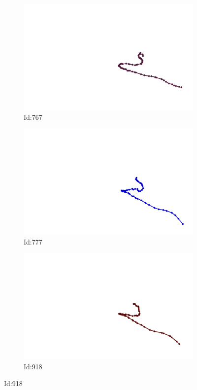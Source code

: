 \documentclass[12pt,twoside]{report}
\begin{document}
\begin{figure}
\centering
\begin{subfigure}[b]{0.20\textwidth}
\centering
\includegraphics[width=\textwidth]{../../trajectories/767.png}
\caption{Id:767}
\end{subfigure}
\begin{subfigure}[b]{0.20\textwidth}
\centering
\includegraphics[width=\textwidth]{../../trajectories/777.png}
\caption{Id:777}
\end{subfigure}
\begin{subfigure}[b]{0.20\textwidth}
\centering
\includegraphics[width=\textwidth]{../../trajectories/918.png}
\caption{Id:918}
\end{subfigure}
\end{figure}
\end{document}
